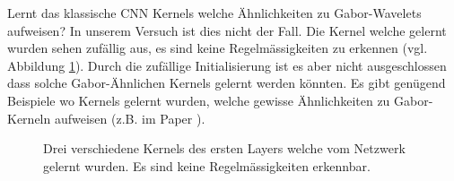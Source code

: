 Lernt das klassische CNN Kernels welche Ähnlichkeiten zu Gabor-Wavelets aufweisen?
In unserem Versuch ist dies nicht der Fall.
Die Kernel welche gelernt wurden sehen zufällig aus, es sind keine Regelmässigkeiten zu erkennen (vgl. Abbildung \ref{fig:cnnkernels}).
Durch die zufällige Initialisierung ist es aber nicht ausgeschlossen dass solche Gabor-Ähnlichen Kernels gelernt werden könnten.
Es gibt genügend Beispiele wo Kernels gelernt wurden, welche gewisse Ähnlichkeiten zu Gabor-Kerneln aufweisen (z.B. im Paper \cite{paper:cifar10}).

\begin{figure}
	\centering
	\caption{Drei verschiedene Kernels des ersten Layers welche vom Netzwerk gelernt wurden. Es sind keine Regelmässigkeiten erkennbar.}
	\label{fig:cnnkernels}
\end{figure}

